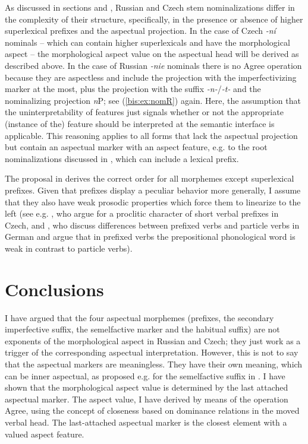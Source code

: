 \documentclass[output=paper]{langscibook}
\begin{document}
As discussed in sections  and , Russian and Czech stem nominalizations differ in the complexity of their structure, specifically, in the presence or absence of higher superlexical prefixes and the aspectual projection. In the case of Czech \textit{-ní} nominals – which can contain higher superlexicals and have the morphological aspect – the morphological aspect value on the aspectual head will be derived as described above. In the case of Russian \textit{-nie} nominals there is no Agree operation because they are aspectless and include the projection with the imperfectivizing marker at the most, plus the projection with the suffix \textit{-n-}/\textit{-t-} and the nominalizing projection \textit{n}P; see (\ref{bis:ex:nomR}) again.  Here, the assumption that the uninterpretability of features just signals whether or not the appropriate (instance of the) feature should be interpreted at the semantic interface is applicable. This reasoning applies to all forms that lack the aspectual projection but contain an aspectual marker with an aspect feature, e.g. to the root nominalizations discussed in , which can include a lexical prefix.

The proposal in  derives the correct order for all morphemes except superlexical prefixes. Given that prefixes display a peculiar behavior more generally, I assume that they also have weak prosodic properties which force them to linearize to the left (see e.g. \citealt{Caha.Zikova2016}, who argue for a proclitic character of short verbal prefixes in Czech, and \citealt{Biskup.etal2011}, who discuss differences between prefixed verbs and particle verbs in German and argue that in prefixed verbs the prepositional phonological word is weak in contrast to particle verbs).

\section{Conclusions}\label{bis:sec:concl} 
I have argued that the four aspectual morphemes (prefixes, the secondary imperfective suffix, the semelfactive marker and the habitual suffix) are not exponents of the morphological aspect in Russian and Czech; they just work as a trigger of the corresponding aspectual interpretation. However, this is not to say that the aspectual markers are meaningless. They have their own meaning, which can be inner aspectual, as proposed e.g. for the semelfactive suffix in . I have shown that the morphological aspect value is determined by the last attached aspectual marker. The aspect value, I have derived by means of the operation Agree, using the concept of closeness based on dominance relations in the moved verbal head. The last-attached aspectual marker is the closest element with a valued aspect feature.
\end{document}
